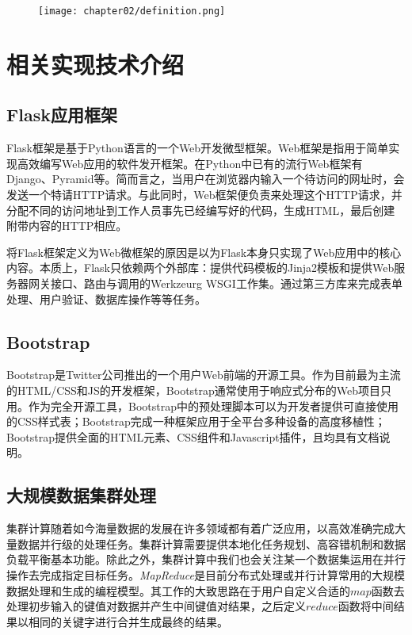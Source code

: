 \begin{figure}[!htp]
  \centering
  \texttt{[image: chapter02/definition.png]}
\end{figure}

\section{相关实现技术介绍}
\label{sec:technology}

\subsection{Flask应用框架}
\label{subsec:flask}
Flask框架是基于Python语言的一个Web开发微型框架。Web框架是指用于简单实现高效编写Web应用的软件发开框架。在Python中已有的流行Web框架有Django、Pyramid等。简而言之，当用户在浏览器内输入一个待访问的网址时，会发送一个特请HTTP请求。与此同时，Web框架便负责来处理这个HTTP请求，并分配不同的访问地址到工作人员事先已经编写好的代码，生成HTML，最后创建附带内容的HTTP相应。

将Flask框架定义为Web微框架的原因是以为Flask本身只实现了Web应用中的核心内容。本质上，Flask只依赖两个外部库：提供代码模板的Jinja2模板和提供Web服务器网关接口、路由与调用的Werkzeurg WSGI工作集\cite{flasklibrary}。通过第三方库来完成表单处理、用户验证、数据库操作等等任务。

\subsection{Bootstrap}
\label{subsec:bootstrap}
Bootstrap是Twitter公司推出的一个用户Web前端的开源工具。作为目前最为主流的HTML/CSS和JS的开发框架，Bootstrap通常使用于响应式分布的Web项目只用。作为完全开源工具，Bootstrap中的预处理脚本可以为开发者提供可直接使用的CSS样式表；Bootstrap完成一种框架应用于全平台多种设备的高度移植性；Bootstrap提供全面的HTML元素、CSS组件和Javascript插件，且均具有文档说明。




\subsection{大规模数据集群处理}
\label{subsec:bigdata-intro}
集群计算随着如今海量数据的发展在许多领域都有着广泛应用，以高效准确完成大量数据并行级的处理任务。集群计算需要提供本地化任务规划、高容错机制和数据负载平衡基本功能。除此之外，集群计算中我们也会关注某一个数据集运用在并行操作去完成指定目标任务。\emph{MapReduce}\cite{dean2008mapreduce}是目前分布式处理或并行计算常用的大规模数据处理和生成的编程模型。其工作的大致思路在于用户自定义合适的$map$函数去处理初步输入的键值对数据并产生中间键值对结果，之后定义$reduce$函数将中间结果以相同的关键字进行合并生成最终的结果。

